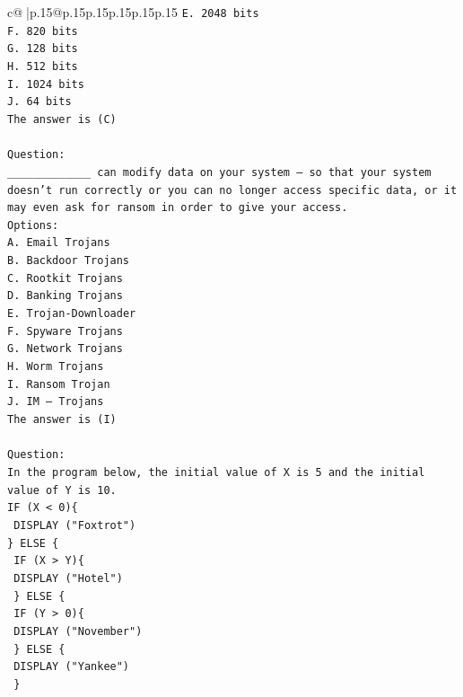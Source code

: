 \documentclass{article}
\begin{document}
{\begin{supertabular}{c@{$\;$}|p{.15\linewidth}@{}p{.15\linewidth}p{.15\linewidth}p{.15\linewidth}p{.15\linewidth}p{.15\linewidth}}
{{{\texttt{E. 2048 bits} \\
\texttt{F. 820 bits} \\
\texttt{G. 128 bits} \\
\texttt{H. 512 bits} \\
\texttt{I. 1024 bits} \\
\texttt{J. 64 bits} \\
\texttt{The answer is (C)} \\
\\ 
\texttt{Question:} \\
\texttt{\_\_\_\_\_\_\_\_\_\_\_\_\_ can modify data on your system – so that your system doesn’t run correctly or you can no longer access specific data, or it may even ask for ransom in order to give your access.} \\
\texttt{Options:} \\
\texttt{A. Email Trojans} \\
\texttt{B. Backdoor Trojans} \\
\texttt{C. Rootkit Trojans} \\
\texttt{D. Banking Trojans} \\
\texttt{E. Trojan{-}Downloader} \\
\texttt{F. Spyware Trojans} \\
\texttt{G. Network Trojans} \\
\texttt{H. Worm Trojans} \\
\texttt{I. Ransom Trojan} \\
\texttt{J. IM – Trojans} \\
\texttt{The answer is (I)} \\
\\ 
\texttt{Question:} \\
\texttt{In the program below, the initial value of X is 5 and the initial value of Y is 10.} \\
\texttt{IF (X < 0)\{} \\
\texttt{ DISPLAY ("Foxtrot")} \\
\texttt{\} ELSE \{} \\
\texttt{ IF (X > Y)\{} \\
\texttt{  DISPLAY ("Hotel")} \\
\texttt{ \} ELSE \{} \\
\texttt{  IF (Y > 0)\{} \\
\texttt{   DISPLAY ("November")} \\
\texttt{  \} ELSE \{} \\
\texttt{   DISPLAY ("Yankee")} \\
\texttt{  \}} \\
}}}
\end{supertabular}}
\end{document}
